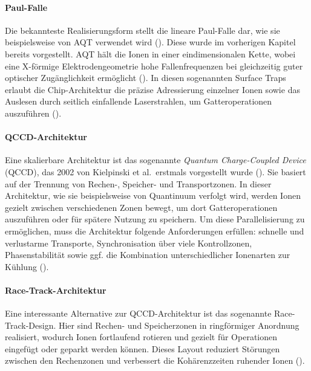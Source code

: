 \paragraph{Paul-Falle}

Die bekannteste Realisierungsform stellt die lineare Paul-Falle dar, wie sie beispielsweise von AQT verwendet wird (\cite{bischoffWettkampfQubits2024}). Diese wurde im vorherigen Kapitel bereits vorgestellt. AQT hält die Ionen in einer eindimensionalen Kette, wobei eine X-förmige Elektrodengeometrie hohe Fallenfrequenzen bei gleichzeitig guter optischer Zugänglichkeit ermöglicht (\cite{frischTrappedIonQuantumComputing2024, strohmIonBasedQuantumComputing2024}). In diesen sogenannten Surface Traps erlaubt die Chip-Architektur die präzise Adressierung einzelner Ionen sowie das Auslesen durch seitlich einfallende Laserstrahlen, um Gatteroperationen auszuführen (\cite{strohmIonBasedQuantumComputing2024}).

\medskip

\paragraph{QCCD-Architektur}

Eine skalierbare Architektur ist das sogenannte \textit{Quantum Charge-Coupled Device} (QCCD), das 2002 von Kielpinski et al.\ erstmals vorgestellt wurde (\cite{kiepinskiArchitectureLargescaleIontrap2002}). Sie basiert auf der Trennung von Rechen-, Speicher- und Transportzonen. In dieser Architektur, wie sie beispielsweise von Quantinuum verfolgt wird, werden Ionen gezielt zwischen verschiedenen Zonen bewegt, um dort Gatteroperationen auszuführen oder für spätere Nutzung zu speichern. Um diese Parallelisierung zu ermöglichen, muss die Architektur folgende Anforderungen erfüllen: schnelle und verlustarme Transporte, Synchronisation über viele Kontrollzonen, Phasenstabilität sowie ggf. die Kombination unterschiedlicher Ionenarten zur Kühlung (\cite{strohmIonBasedQuantumComputing2024}).

\medskip

\paragraph{Race-Track-Architektur}

Eine interessante Alternative zur QCCD-Architektur ist das sogenannte Race-Track-Design. Hier sind Rechen- und Speicherzonen in ringförmiger Anordnung realisiert, wodurch Ionen fortlaufend rotieren und gezielt für Operationen eingefügt oder geparkt werden können. Dieses Layout reduziert Störungen zwischen den Rechenzonen und verbessert die Kohärenzzeiten ruhender Ionen (\cite{strohmIonBasedQuantumComputing2024}).

